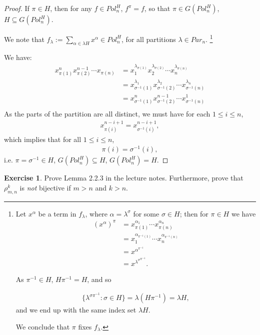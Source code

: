 \documentclass[12pt]{extarticle}
\newcommand{\set}[1]{\{#1\}}
\newcommand{\<}{\langle}
\renewcommand{\>}{\rangle}
\theoremstyle{definition}
\newtheorem{exercise}{Exercise}
\begin{document}
\begin{proof}
  If $\pi \in H$, then for any $f \in Pol_n^H$, $f^{\pi} = f$, so that $\pi \in G(Pol_n^H)$, $H \subseteq G(Pol_n^H)$.

  We note that $f_{\lambda} := \sum\limits_{\alpha \in \lambda H} x^{\alpha} \in Pol_n^H$, for all partitions $\lambda \in Par_n$.
  \footnote{Let $x^\alpha$ be a term in $f_{\lambda}$, where $\alpha = \lambda^{\sigma}$ for some $\sigma \in H$; then for $\pi \in H$ we have
  \begin{align*}
    (x^\alpha)^{\pi}
    &= x_{\pi(1)}^{\alpha_1} \cdots x_{\pi(n)}^{\alpha_n} \\
    &= x_{1}^{\alpha_{\pi^{-1}(1)}} \cdots x_{n}^{\alpha_{\pi^{-1}(n)}} \\
    &= x^{\alpha^{\pi^{-1}}} \\ 
    &= x^{{\lambda^{\sigma}}^{\pi^{-1}}}.
  \end{align*}

  As $\pi^{-1} \in H$, $H\pi^{-1} = H$, and so 
  
  \begin{align*}
    \set{\lambda^{\sigma \pi^{-1}}: \sigma \in H} = \lambda(H \pi^{-1}) = \lambda H,
  \end{align*}
  and we end up with the same index set $\lambda H$.

  We conclude that $\pi$ fixes $f_{\lambda}$.

  }

  

  We have:
  \begin{align*}
    x_{\pi(1)}^nx_{\pi(2)}^{n-1} \cdots x_{\pi(n)}
    &= x_1^{\lambda_{\sigma(1)}} x_2^{\lambda_{\sigma(2)}} \cdots x_n^{\lambda_{\sigma(n)}} \\
    &= x_{\sigma^{-1}(1)}^{\lambda_1} x_{\sigma^{-1}(2)}^{\lambda_2} \cdots x_{\sigma^{-1}(n)}^{\lambda_n} \\
    &= x_{\sigma^{-1}(1)}^{n} x_{\sigma^{-1}(2)}^{n-1} \cdots x_{\sigma^{-1}(n)}^{1} \\
  \end{align*}
  As the parts of the partition are all distinct, we must have for each $1 \leq i \leq n$,
  \begin{align*}
    x_{\pi(i)}^{n-i+1} = x_{\sigma^{-1}(i)}^{n-i+1},
  \end{align*}
  which implies that for all $1 \leq i \leq n$,
  \begin{align*}
    \pi(i) = \sigma^{-1}(i),
  \end{align*}
  i.e. $\pi = \sigma^{-1} \in H$, $G(Pol_n^H) \subseteq H$, $G(Pol_n^H) = H$.

\end{proof}

\begin{exercise}
  Prove Lemma 2.2.3 in the lecture notes. Furthermore, prove that $\rho_{m,n}^k$ is \emph{not} bijective if $m>n$ and $k>n$.
\end{exercise}
\end{document}
